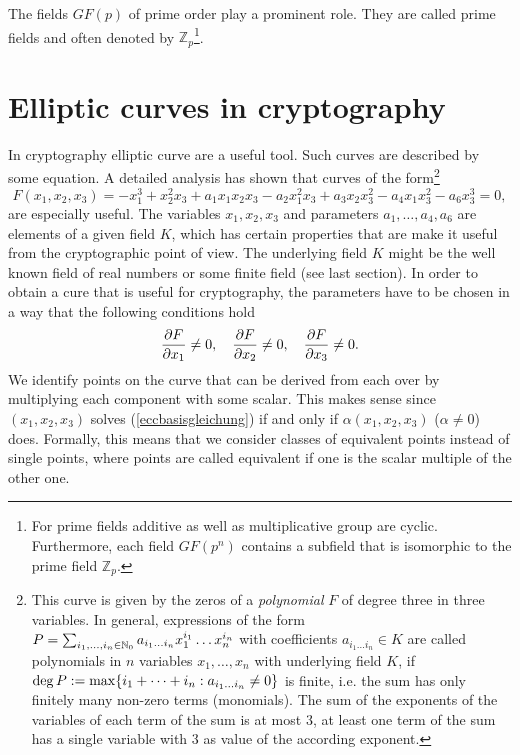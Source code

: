 The fields $GF(p)$ of prime order play a prominent role. They are called prime fields and often denoted by ${\mathbb Z}_p$\footnote{For prime fields additive as well as multiplicative group are cyclic. Furthermore, each field $GF(p^n)$ contains a subfield that is isomorphic to the prime field ${\mathbb Z}_p$.}.



\section{Elliptic curves in cryptography}\label{ECC-Crypto}

In cryptography elliptic curve are a useful tool. Such curves are described by some equation. A detailed analysis has shown that curves of the form\footnote{This curve is given by the zeros of a {\it polynomial} $F$ of degree three in three variables. In general, expressions of the form
$P=\sum_{i_1,\dots,i_n\in\mathbb{N}_0} a_{i_1\dots i_n} x_1^{i_1}\dots x_n^{i_n}$ with coefficients $a_{i_1\dots i_n}\in K$ are called polynomials in $n$ variables $x_1,\dots,x_n$ with underlying field $K$, if ${\rm deg\,} P:=\max\{i_1+\dots +i_n: a_{i_1\dots i_n}\ne 0\}$ is finite, i.e. the sum has only finitely many non-zero terms (monomials). The sum of the exponents of the variables of each term of the sum is at most $3$, at least one term of the sum has a single variable with $3$ as value of the according exponent.}
\begin{equation}
 F(x_1,x_2,x_3)=-x_1^3+x_2^2x_3+a_1x_1x_2x_3-a_2x_1^2x_3+a_3x_2x_3^2-a_4x_1x_3^2-a_6x_3^3=0,
\label{eccbasisgleichung}
\end{equation}
are especially useful. The variables $x_1,x_2,x_3$ and parameters $a_1,\dots,a_4,a_6$ are elements of a given field $K$, which has certain properties that are make it useful from the cryptographic point of view. The underlying field $K$ might be the well known field of real numbers or some finite field (see last section).
In order to obtain a cure that is useful for cryptography, the parameters have to be chosen in a way that the following conditions hold
$$ {\partial F\over\partial x_1}\ne 0, \quad {\partial F\over\partial x_2}\ne 0, \quad
{\partial F\over\partial x_3}\ne 0 .
$$
We identify points on the curve that can be derived from each over by multiplying each component with some scalar. This makes sense since $(x_1,x_2,x_3)$ solves (\ref{eccbasisgleichung}) if and only if $\alpha (x_1,x_2,x_3)$ ($\alpha\ne 0$) does. Formally, this means that we consider classes of equivalent points instead of single points, where points are called equivalent if one is the scalar multiple of the other one.
